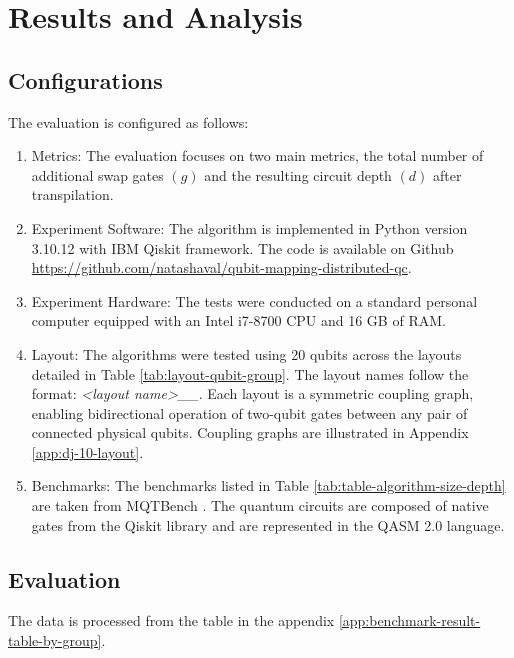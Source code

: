 \chapter{Results and Analysis} \label{Chap4}
\section{Configurations} %
The evaluation is configured as follows:
\begin{enumerate}
    \item Metrics: The evaluation focuses on two main metrics, the total number of additional swap gates $(g)$ and the resulting circuit depth $(d)$ after transpilation.
    \item Experiment Software: The algorithm is implemented in Python version 3.10.12 with IBM Qiskit framework. The code is available on Github \url{https://github.com/natashaval/qubit-mapping-distributed-qc}.
    \item Experiment Hardware: The tests were conducted on a standard personal computer equipped with an Intel i7-8700 CPU and 16 GB of RAM.
    \item Layout: The algorithms were tested using 20 qubits across the layouts detailed in Table  \ref{tab:layout-qubit-group}. The layout names follow the format: \textit{<layout name>\_<number of qubits>\_<number of groups>}. Each layout is a symmetric coupling graph, enabling bidirectional operation of two-qubit gates between any pair of connected physical qubits. Coupling graphs are illustrated in Appendix \ref{app:dj-10-layout}.
        
    \item Benchmarks: The benchmarks  listed in Table \ref{tab:table-algorithm-size-depth} are taken from MQTBench \cite{quetschlich_mqt_2023}. The quantum circuits are composed of native gates from the Qiskit library and are represented in the QASM 2.0 language.
        
\end{enumerate}

\section{Evaluation}
The data is processed from the table in the appendix \ref{app:benchmark-result-table-by-group}.
